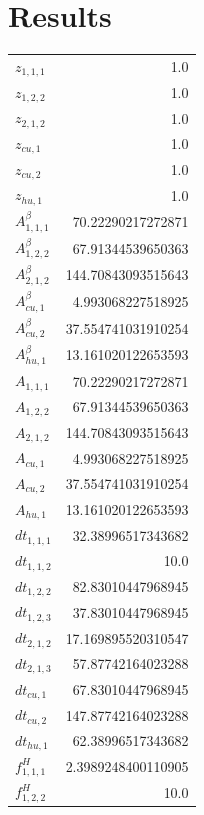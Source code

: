 \documentclass{article}%
\makeatletter
\let\mcnewpage=\newpage%
\newcommand{\TrickSupertabularIntoMulticols}{%
\renewcommand\newpage{%
\if@firstcolumn%
\hrule width\linewidth height0pt%
\columnbreak%
\else%
\mcnewpage%
\fi%
}%
}%
\makeatother
\begin{document}
\section{Results}%
\thispagestyle{plain}%
\begin{multicols*}{3}%
\TrickSupertabularIntoMulticols%
%
\begin{supertabular}{lr}%
	$z_{1,1,1}$ & 1.0 \\%
	$z_{1,2,2}$ & 1.0 \\%
	$z_{2,1,2}$ & 1.0 \\%
	$z_{cu,1}$ & 1.0 \\%
	$z_{cu,2}$ & 1.0 \\%
	$z_{hu,1}$ & 1.0 \\%
	$A_{1,1,1}^{\beta}$ & 70.22290217272871 \\%
	$A_{1,2,2}^{\beta}$ & 67.91344539650363 \\%
	$A_{2,1,2}^{\beta}$ & 144.70843093515643 \\%
	$A_{cu,1}^{\beta}$ & 4.993068227518925 \\%
	$A_{cu,2}^{\beta}$ & 37.554741031910254 \\%
	$A_{hu,1}^{\beta}$ & 13.161020122653593 \\%
	$A_{1,1,1}$ & 70.22290217272871 \\%
	$A_{1,2,2}$ & 67.91344539650363 \\%
	$A_{2,1,2}$ & 144.70843093515643 \\%
	$A_{cu,1}$ & 4.993068227518925 \\%
	$A_{cu,2}$ & 37.554741031910254 \\%
	$A_{hu,1}$ & 13.161020122653593 \\%
	$dt_{1,1,1}$ & 32.38996517343682 \\%
	$dt_{1,1,2}$ & 10.0 \\%
	$dt_{1,2,2}$ & 82.83010447968945 \\%
	$dt_{1,2,3}$ & 37.83010447968945 \\%
	$dt_{2,1,2}$ & 17.169895520310547 \\%
	$dt_{2,1,3}$ & 57.87742164023288 \\%
	$dt_{cu,1}$ & 67.83010447968945 \\%
	$dt_{cu,2}$ & 147.87742164023288 \\%
	$dt_{hu,1}$ & 62.38996517343682 \\%
	$f_{1,1,1}^{H}$ & 2.3989248400110905 \\%
	$f_{1,2,2}^{H}$ & 10.0 \\%

\end{supertabular}
\end{multicols*}
\end{document}
